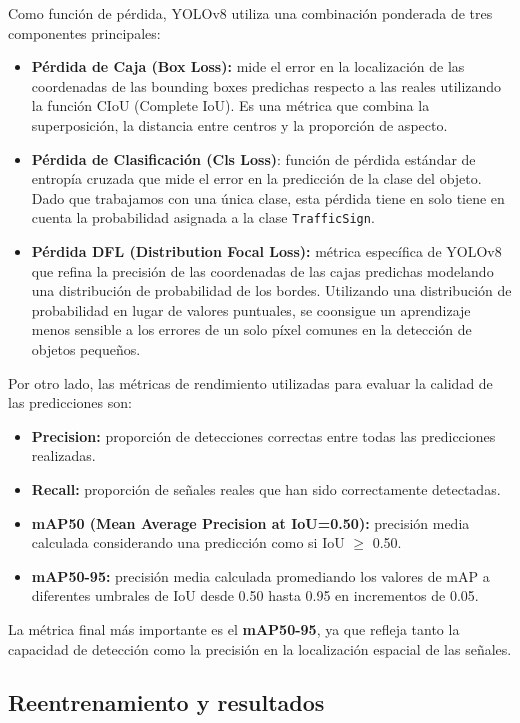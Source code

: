 \documentclass[11pt,a4paper]{article}
\begin{document}
Como función de pérdida, YOLOv8 utiliza una combinación ponderada de tres componentes principales:
\begin{itemize}
    \item \textbf{Pérdida de Caja (Box Loss):} mide el error en la localización de las coordenadas de las bounding
    boxes predichas respecto a las reales utilizando la función CIoU (Complete IoU). Es una métrica
    que combina la superposición, la distancia entre centros y la proporción de aspecto.
    \item \textbf{Pérdida de Clasificación (Cls Loss)}: función de pérdida estándar de entropía cruzada
    que mide el error en la predicción de la clase del objeto. Dado que trabajamos con una única clase,
    esta pérdida tiene en solo tiene en cuenta la probabilidad asignada a la clase \texttt{TrafficSign}.
    \item \textbf{Pérdida DFL (Distribution Focal Loss):} métrica específica de YOLOv8 que refina 
    la precisión de las coordenadas de las cajas predichas modelando una distribución de probabilidad 
    de los bordes. Utilizando una distribución de probabilidad en lugar de valores puntuales,
    se coonsigue un aprendizaje menos sensible a los errores de un solo píxel comunes en la detección de
    objetos pequeños.
\end{itemize}

Por otro lado, las métricas de rendimiento utilizadas para evaluar la calidad de las predicciones son:
\begin{itemize}
    \item \textbf{Precision:} proporción de detecciones correctas entre todas las predicciones realizadas.
    \item \textbf{Recall:} proporción de señales reales que han sido correctamente detectadas.
    \item \textbf{mAP50 (Mean Average Precision at IoU=0.50):} precisión media calculada considerando una predicción 
    como si IoU $\geq$ 0.50.
    \item \textbf{mAP50-95:} precisión media calculada promediando los valores de mAP a diferentes umbrales de IoU 
    desde 0.50 hasta 0.95 en incrementos de 0.05.
\end{itemize}
La métrica final más importante es el \textbf{mAP50-95}, ya que refleja tanto la capacidad de detección como la precisión en la localización espacial de las señales.

\subsection{Reentrenamiento y resultados}
\end{document}
